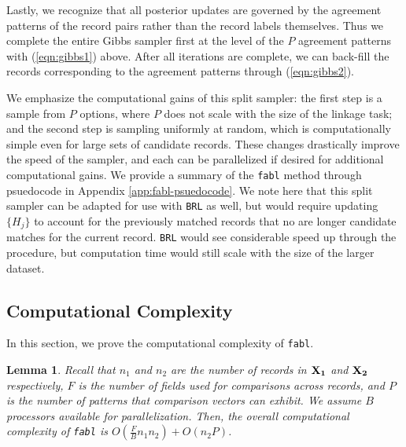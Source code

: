 \documentclass[ba]{imsart}
\newtheorem{lemma}{Lemma}
\begin{document}
	Lastly, we recognize that all posterior updates are governed by the agreement patterns of the record pairs rather than the record labels themselves. Thus we complete the entire Gibbs sampler first at the level of the \(P\) agreement patterns with (\ref{eqn:gibbs1}) above. After all iterations are complete, we can back-fill the records corresponding to the agreement patterns through (\ref{eqn:gibbs2}). 
	
	We emphasize the computational gains of this split sampler: the first step is a sample from $P$ options, where $P$ does not scale with the size of the linkage task; and the second step is sampling uniformly at random, which is computationally simple even for large sets of candidate records. These changes drastically improve the speed of the sampler, and each can be parallelized if desired for additional computational gains. We provide a summary of the \texttt{fabl} method through psuedocode in Appendix \ref{app:fabl-psuedocode}. We note here that this split sampler can be adapted for use with \texttt{BRL} as well, but would require updating $\{H_j\}$ to account for the previously matched records that no are longer candidate matches for the current record. \texttt{BRL} would see considerable speed up through the procedure, but computation time would still scale with the size of the larger dataset.
	
	\hypertarget{computational-complexity}{%
		\subsection{Computational Complexity}\label{computational-complexity}}
	In this section, we prove the computational complexity of \texttt{fabl}.
	
	\begin{lemma}
		Recall that $n_1$ and $n_2$ are the number of records in $\bf{X}_1$ and $\bf{X}_2$ respectively, $F$ is the number of fields used for comparisons across records, and $P$ is the number of patterns that comparison vectors can exhibit. We assume $B$ processors available for parallelization. Then, the overall computational complexity of \texttt{fabl} is $O(\frac{F}{B} n_1 n_2) + O(n_2 P)$.
		\label{lemma:fabl}
	\end{lemma}
	
\end{document}
